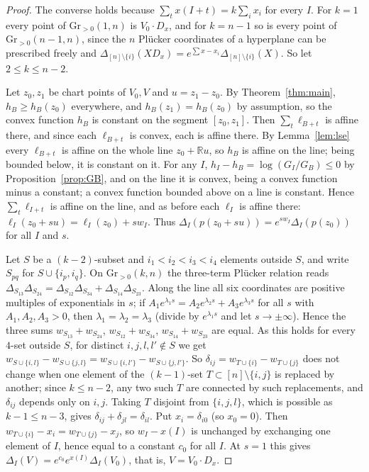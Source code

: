 \documentclass[11pt]{article}
\theoremstyle{remark}
\newcommand{\Gr}{\mathrm{Gr}}
\newcommand{\R}{\mathbb{R}}
\begin{document}
\begin{proof}
The converse holds because $\sum_t x(I+t)=k\sum_ix_i$ for every $I$. For $k=1$ every point of $\Gr_{>0}(1,n)$ is $V_0\cdot D_x$, and for $k=n-1$ so is every point of $\Gr_{>0}(n-1,n)$, since the $n$ Pl\"ucker coordinates of a hyperplane can be prescribed freely and $\Delta_{[n]\setminus\{i\}}(XD_x)=e^{\sum x-x_i}\Delta_{[n]\setminus\{i\}}(X)$. So let $2\le k\le n-2$.

Let $z_0,z_1$ be chart points of $V_0,V$ and $u=z_1-z_0$. By Theorem~\ref{thm:main}, $h_B\ge h_B(z_0)$ everywhere, and $h_B(z_1)=h_B(z_0)$ by assumption, so the convex function $h_B$ is constant on the segment $[z_0,z_1]$. Then $\sum_t\ell_{B+t}$ is affine there, and since each $\ell_{B+t}$ is convex, each is affine there. By Lemma~\ref{lem:lse} every $\ell_{B+t}$ is affine on the whole line $z_0+\R u$, so $h_B$ is affine on the line; being bounded below, it is constant on it. For any $I$, $h_I-h_B=\log(G_I/G_B)\le0$ by Proposition~\ref{prop:GB}, and on the line it is convex, being a convex function minus a constant; a convex function bounded above on a line is constant. Hence $\sum_t\ell_{I+t}$ is affine on the line, and as before each $\ell_I$ is affine there: $\ell_I(z_0+su)=\ell_I(z_0)+sw_I$. Thus $\Delta_I(p(z_0+su))=e^{sw_I}\Delta_I(p(z_0))$ for all $I$ and $s$.

Let $S$ be a $(k-2)$-subset and $i_1<i_2<i_3<i_4$ elements outside $S$, and write $S_{pq}$ for $S\cup\{i_p,i_q\}$. On $\Gr_{>0}(k,n)$ the three-term Pl\"ucker relation \cite[(3.1)]{ALS} reads $\Delta_{S_{13}}\Delta_{S_{24}}=\Delta_{S_{12}}\Delta_{S_{34}}+\Delta_{S_{14}}\Delta_{S_{23}}$. Along the line all six coordinates are positive multiples of exponentials in $s$; if $A_1e^{\lambda_1s}=A_2e^{\lambda_2s}+A_3e^{\lambda_3s}$ for all $s$ with $A_1,A_2,A_3>0$, then $\lambda_1=\lambda_2=\lambda_3$ (divide by $e^{\lambda_1s}$ and let $s\to\pm\infty$). Hence the three sums $w_{S_{13}}+w_{S_{24}}$, $w_{S_{12}}+w_{S_{34}}$, $w_{S_{14}}+w_{S_{23}}$ are equal. As this holds for every $4$-set outside $S$, for distinct $i,j,l,l'\notin S$ we get $w_{S\cup\{i,l\}}-w_{S\cup\{j,l\}}=w_{S\cup\{i,l'\}}-w_{S\cup\{j,l'\}}$. So $\delta_{ij}=w_{T\cup\{i\}}-w_{T\cup\{j\}}$ does not change when one element of the $(k-1)$-set $T\subset[n]\setminus\{i,j\}$ is replaced by another; since $k\le n-2$, any two such $T$ are connected by such replacements, and $\delta_{ij}$ depends only on $i,j$. Taking $T$ disjoint from $\{i,j,l\}$, which is possible as $k-1\le n-3$, gives $\delta_{ij}+\delta_{jl}=\delta_{il}$. Put $x_i=\delta_{i0}$ (so $x_0=0$). Then $w_{T\cup\{i\}}-x_i=w_{T\cup\{j\}}-x_j$, so $w_I-x(I)$ is unchanged by exchanging one element of $I$, hence equal to a constant $c_0$ for all $I$. At $s=1$ this gives $\Delta_I(V)=e^{c_0}e^{x(I)}\Delta_I(V_0)$, that is, $V=V_0\cdot D_x$.
\end{proof}
\end{document}
